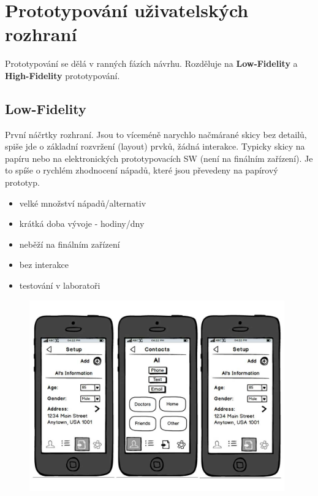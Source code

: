 \section[NUR - Prototypování uživatelských rozhraní]{Prototypování uživatelských rozhraní}
Prototypování se dělá v ranných fázích návrhu. Rozděluje na \textbf{Low-Fidelity} a \textbf{High-Fidelity} prototypování.

\subsection{Low-Fidelity}
První náčrtky rozhraní. Jsou to víceméně narychlo načmárané skicy bez detailů, spiše jde o základní rozvržení (layout) prvků, žádná interakce. Typicky skicy na papíru nebo na elektronických prototypovacích SW (není na finálním zařízení). Je to spíše o rychlém zhodnocení nápadů, které jsou převedeny na papírový prototyp.

\begin{itemize}[itemsep=0px]
\item velké množství nápadů/alternativ
\item krátká doba vývoje - hodiny/dny
\item neběží na finálním zařízení
\item bez interakce
\item testování v laboratoři
\end{itemize}

\vspace{20px}

\begin{figure}[h!]
\centering
\includegraphics[width=110mm]{06/images/lofi}
\end{figure}

